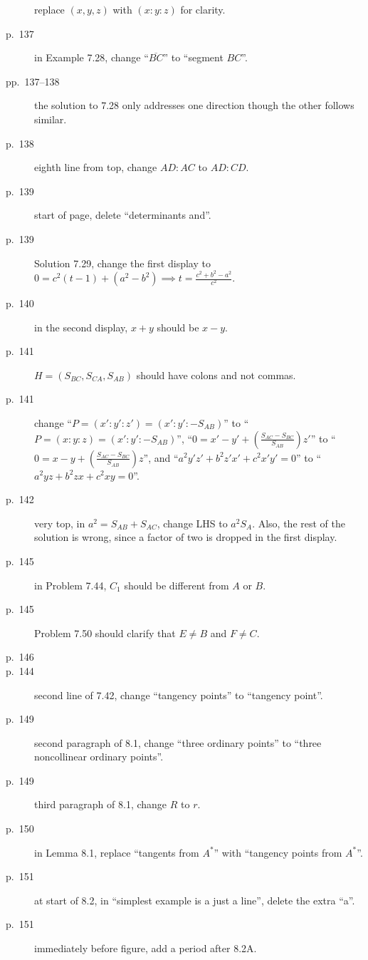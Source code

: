 \documentclass[11pt]{scrartcl}
\begin{document}
\begin{description}
  replace $(x,y,z)$ with $(x:y:z)$ for clarity.
\item[p.\  137] in Example 7.28, change ``$\overline{BC}$'' to ``segment $BC$''.
\item[pp.\  137--138] the solution to 7.28 only addresses one direction
  though the other follows similar.
\item[p.\  138] eighth line from top, change $AD:AC$ to $AD:CD$.
\item[p.\  139] start of page, delete ``determinants and''.
\item[p.\  139] Solution 7.29, change the first display to
  $0 = c^2(t-1) + (a^2-b^2) \implies t = \frac{c^2+b^2-a^2}{c^2}$.
\item[p.\  140] in the second display, $x+y$ should be $x-y$.
\item[p.\  141] $H = (S_{BC},S_{CA},S_{AB})$ should have
  colons and not commas.
\item[p.\  141] change ``$P = \left(x' : y' : z'\right) = \left(x' : y' : -S_{AB}\right)$''
  to ``$P = \left(x : y : z\right) = \left(x' : y' : -S_{AB}\right)$'',
  ``$0 = x' - y' + \left( \frac{S_{AC}-S_{BC}}{S_{AB}} \right) z'$''
  to ``$0 = x - y + \left( \frac{S_{AC}-S_{BC}}{S_{AB}} \right) z$'',
  and ``$a^2 y'z' + b^2 z'x' + c^2 x'y' = 0$''
  to ``$a^2 yz + b^2 zx + c^2 xy = 0$''.
\item[p.\  142] very top, in $a^2=S_{AB}+S_{AC}$, change LHS to $a^2S_A$.
  Also, the rest of the solution is wrong, since a factor of two is dropped in the first display.
\item[p.\  145] in Problem 7.44, $C_1$ should be different from $A$ or $B$.
\item[p.\  145] Problem 7.50 should clarify that $E \neq B$ and $F \neq C$.
\item[p.\  146] 
\item[p.\  144] second line of 7.42, change ``tangency points'' to ``tangency point''.
\item[p.\  149] second paragraph of 8.1, change ``three ordinary points''
  to ``three noncollinear ordinary points''.
\item[p.\  149] third paragraph of 8.1, change $R$ to $r$.
\item[p.\  150] in Lemma 8.1, replace ``tangents from $A^\ast$'' with ``tangency points from $A^\ast$''.
\item[p.\  151] at start of 8.2, in ``simplest example is a just a line'', delete the extra ``a''.
\item[p.\  151] immediately before figure, add a period after 8.2A.

\end{description}
\end{document}
